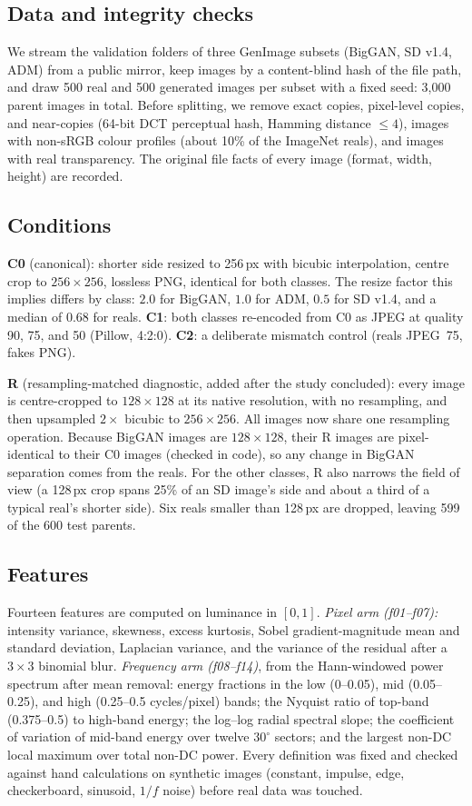 \documentclass[conference]{IEEEtran}
\begin{document}
\subsection{Data and integrity checks}
We stream the validation folders of three GenImage subsets (BigGAN, SD v1.4, ADM) from a public mirror, keep images by a content-blind hash of the file path, and draw 500 real and 500 generated images per subset with a fixed seed: 3,000 parent images in total. Before splitting, we remove exact copies, pixel-level copies, and near-copies (64-bit DCT perceptual hash, Hamming distance $\le 4$), images with non-sRGB colour profiles (about 10\% of the ImageNet reals), and images with real transparency. The original file facts of every image (format, width, height) are recorded.

\subsection{Conditions}
\textbf{C0} (canonical): shorter side resized to 256\,px with bicubic interpolation, centre crop to $256\times256$, lossless PNG, identical for both classes. The resize factor this implies differs by class: $2.0$ for BigGAN, $1.0$ for ADM, $0.5$ for SD v1.4, and a median of $0.68$ for reals. \textbf{C1}: both classes re-encoded from C0 as JPEG at quality 90, 75, and 50 (Pillow, 4:2:0). \textbf{C2}: a deliberate mismatch control (reals JPEG~75, fakes PNG).

\textbf{R} (resampling-matched diagnostic, added after the study concluded): every image is centre-cropped to $128\times128$ at its native resolution, with no resampling, and then upsampled $2\times$ bicubic to $256\times256$. All images now share one resampling operation. Because BigGAN images are $128\times128$, their R images are pixel-identical to their C0 images (checked in code), so any change in BigGAN separation comes from the reals. For the other classes, R also narrows the field of view (a 128\,px crop spans 25\% of an SD image's side and about a third of a typical real's shorter side). Six reals smaller than 128\,px are dropped, leaving 599 of the 600 test parents.

\subsection{Features}
Fourteen features are computed on luminance in $[0,1]$. \textit{Pixel arm (f01--f07):} intensity variance, skewness, excess kurtosis, Sobel gradient-magnitude mean and standard deviation, Laplacian variance, and the variance of the residual after a $3\times3$ binomial blur. \textit{Frequency arm (f08--f14)}, from the Hann-windowed power spectrum after mean removal: energy fractions in the low (0--0.05), mid (0.05--0.25), and high (0.25--0.5 cycles/pixel) bands; the Nyquist ratio of top-band (0.375--0.5) to high-band energy; the log--log radial spectral slope; the coefficient of variation of mid-band energy over twelve $30^\circ$ sectors; and the largest non-DC local maximum over total non-DC power. Every definition was fixed and checked against hand calculations on synthetic images (constant, impulse, edge, checkerboard, sinusoid, $1/f$ noise) before real data was touched.
\end{document}
